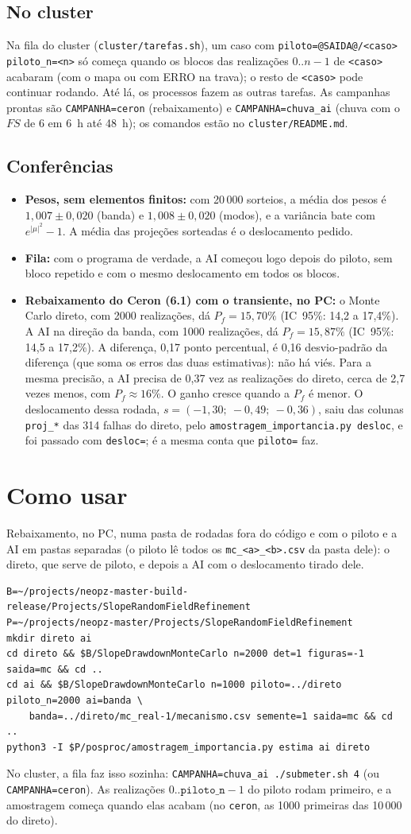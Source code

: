\documentclass[11pt,a4paper]{article}
\newcommand{\AIresultado}{o Monte Carlo direto, com 2000 realizações, dá $P_f = 15{,}70\%$ (IC~95\%: 14,2 a 17,4\%).
A AI na direção da banda, com 1000 realizações, dá $P_f = 15{,}87\%$ (IC~95\%: 14,5 a 17,2\%). A diferença, 0,17 ponto
percentual, é 0,16 desvio-padrão da diferença (que soma os erros das duas estimativas): não há viés. Para a mesma
precisão, a AI precisa de 0,37 vez as realizações do direto, cerca de 2,7 vezes menos, com $P_f \approx 16\%$. O ganho
cresce quando a $P_f$ é menor. O deslocamento dessa rodada, $s = (-1{,}30;\ -0{,}49;\ -0{,}36)$, saiu das colunas
\texttt{proj\_*} das 314 falhas do direto, pelo \texttt{amostragem\_importancia.py desloc}, e foi passado com
\texttt{desloc=}; é a mesma conta que \texttt{piloto=} faz.}
\begin{document}
\subsection{No cluster}
Na fila do cluster (\texttt{cluster/tarefas.sh}), um caso com \texttt{piloto=@SAIDA@/<caso> piloto\_n=<n>} só começa quando
os blocos das realizações $0..n-1$ de \texttt{<caso>} acabaram (com o mapa ou com ERRO na trava); o resto de
\texttt{<caso>} pode continuar rodando. Até lá, os processos fazem as outras tarefas. As campanhas prontas são
\texttt{CAMPANHA=ceron} (rebaixamento) e \texttt{CAMPANHA=chuva\_ai} (chuva com o $FS$ de 6 em 6~h até 48~h); os comandos
estão no \texttt{cluster/README.md}.

\subsection{Conferências}
\begin{itemize}
\item \textbf{Pesos, sem elementos finitos:} com 20\,000 sorteios, a média dos pesos é $1{,}007 \pm 0{,}020$ (banda) e
$1{,}008 \pm 0{,}020$ (modos), e a variância bate com $e^{|\mu|^2} - 1$. A média das projeções sorteadas é o deslocamento
pedido.
\item \textbf{Fila:} com o programa de verdade, a AI começou logo depois do piloto, sem bloco repetido e com o mesmo
deslocamento em todos os blocos.
\item \textbf{Rebaixamento do Ceron (6.1) com o transiente, no PC:} \AIresultado
\end{itemize}

\section{Como usar}
Rebaixamento, no PC, numa pasta de rodadas fora do código e com o piloto e a AI em pastas separadas (o piloto lê todos
os \texttt{mc\_<a>\_<b>.csv} da pasta dele): o direto, que serve de piloto, e depois a AI com o deslocamento tirado dele.
\begin{verbatim}
B=~/projects/neopz-master-build-release/Projects/SlopeRandomFieldRefinement
P=~/projects/neopz-master/Projects/SlopeRandomFieldRefinement
mkdir direto ai
cd direto && $B/SlopeDrawdownMonteCarlo n=2000 det=1 figuras=-1 saida=mc && cd ..
cd ai && $B/SlopeDrawdownMonteCarlo n=1000 piloto=../direto piloto_n=2000 ai=banda \
    banda=../direto/mc_real-1/mecanismo.csv semente=1 saida=mc && cd ..
python3 -I $P/posproc/amostragem_importancia.py estima ai direto
\end{verbatim}
No cluster, a fila faz isso sozinha: \texttt{CAMPANHA=chuva\_ai ./submeter.sh 4} (ou \texttt{CAMPANHA=ceron}). As
realizações $0..\texttt{piloto\_n}-1$ do piloto rodam primeiro, e a amostragem começa quando elas acabam (no
\texttt{ceron}, as 1000 primeiras das 10\,000 do direto).
\end{document}
